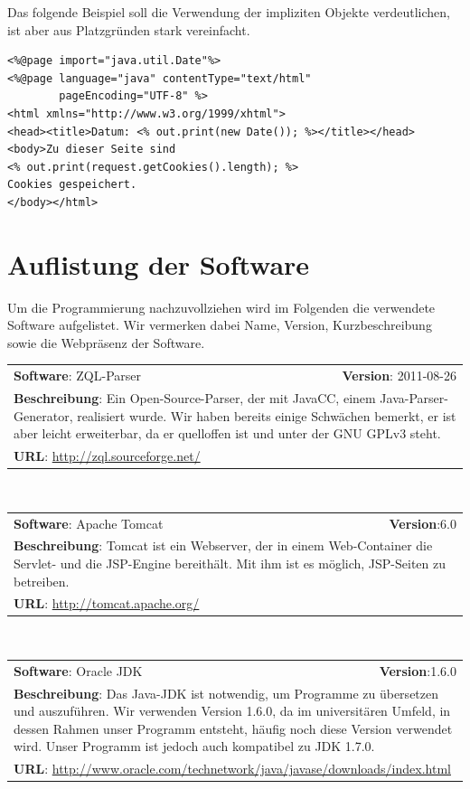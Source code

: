 Das folgende Beispiel soll die Verwendung der impliziten Objekte verdeutlichen, ist aber aus Platzgründen stark vereinfacht.
\lstset{language=Java}
\begin{lstlisting}
<%@page import="java.util.Date"%>
<%@page language="java" contentType="text/html" 
		pageEncoding="UTF-8" %>
<html xmlns="http://www.w3.org/1999/xhtml">
<head><title>Datum: <% out.print(new Date()); %></title></head>
<body>Zu dieser Seite sind 
<% out.print(request.getCookies().length); %> 
Cookies gespeichert.
</body></html>
\end{lstlisting}

\section{Auflistung der Software}

Um die Programmierung nachzuvollziehen wird im Folgenden die verwendete Software aufgelistet. Wir vermerken dabei Name, Version, Kurzbeschreibung sowie die Webpräsenz der Software.

\begin{tabular}{p{9cm}r}
\textbf{Software}: ZQL-Parser & \textbf{Version}: 2011-08-26\\
\multicolumn{2}{p{1\textwidth}}{\textbf{Beschreibung}: Ein Open-Source-Parser, der mit JavaCC, einem Java-Parser-Generator, realisiert wurde. Wir haben bereits einige Schwächen bemerkt, er ist aber leicht erweiterbar, da er quelloffen ist und unter der GNU GPLv3 steht.}\\
\multicolumn{2}{l}{\textbf{URL}: \url{http://zql.sourceforge.net/}}
\end{tabular}\\

\begin{tabular}{p{9cm}r}
\textbf{Software}: Apache Tomcat & \textbf{Version}:6.0\\
\multicolumn{2}{p{1\textwidth}}{\textbf{Beschreibung}: Tomcat ist ein Webserver, der in einem Web-Container die Servlet- und die JSP-Engine bereithält. Mit ihm ist es möglich, JSP-Seiten zu betreiben.}\\
\multicolumn{2}{l}{\textbf{URL}: \url{http://tomcat.apache.org/}}
\end{tabular}\\

\begin{tabular}{p{9cm}r}
\textbf{Software}: Oracle JDK  & \textbf{Version}:1.6.0\\
\multicolumn{2}{p{1\textwidth}}{\textbf{Beschreibung}: Das Java-JDK ist notwendig, um Programme zu übersetzen und auszuführen. Wir verwenden Version 1.6.0, da im universitären Umfeld, in dessen Rahmen unser Programm entsteht, häufig noch diese Version verwendet wird. Unser Programm ist jedoch auch kompatibel zu JDK 1.7.0.}\\
\multicolumn{2}{l}{\textbf{URL}: \url{http://www.oracle.com/technetwork/java/javase/downloads/index.html}}
\end{tabular}\\

